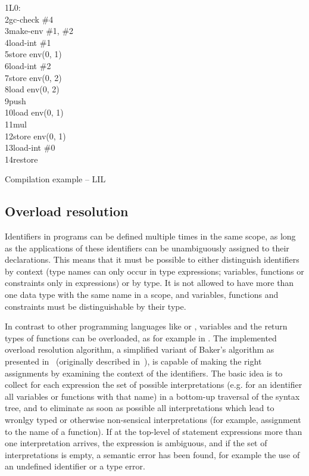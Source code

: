 \begin{Program}
\begin{ttlprog}
1\>L0:\\
2\>\>gc-check  \#4\\
3\>\>make-env  \#1, \#2\\
4\>\>load-int   \#1\\
5\>\>store     env(0, 1)\\
6\>\>load-int  \#2\\
7\>\>store     env(0, 2)\\
8\>\>load      env(0, 2)\\
9\>\>push\\
10\>\>load      env(0, 1)\\
11\>\>mul\\
12\>\>store     env(0, 1)\\
13\>\>load-int  \#0\\
14\>\>restore
\end{ttlprog}
\caption{Compilation example -- LIL}
\label{prog:mini-prog-lil}
\end{Program}

\subsection{Overload resolution}
\label{sec:overload-resolution}

%
Identifiers in \turtle{} programs can be defined multiple times in the
same scope, as long as the applications of these identifiers can be
unambiguously assigned to their declarations.  This means that it must
be possible to either distinguish identifiers by context (type names
can only occur in type expressions; variables, functions or
constraints only in expressions) or by type.  It is not allowed to
have more than one data type with the same name in a scope, and
variables, functions and constraints must be distinguishable by their
type.

%
In contrast to other programming languages like \java{} or
\cplusplus{}, variables and the return types of functions can be
overloaded, as for example in \ada{}.  The implemented overload
resolution algorithm, a simplified variant of Baker's algorithm as
presented in~\cite{bilsonOverload} (originally described
in~\cite{baker82overload}), is capable of making the right assignments
by examining the context of the identifiers.  The basic idea is to
collect for each expression the set of possible interpretations (e.g.
for an identifier all variables or functions with that name) in a
bottom-up traversal of the syntax tree, and to eliminate as soon as
possible all interpretations which lead to wronlgy typed or otherwise
non-sensical interpretations (for example, assignment to the name of a
function).  If at the top-level of statement expressions more than one
interpretation arrives, the expression is ambiguous, and if the set of
interpretations is empty, a semantic error has been found, for example
the use of an undefined identifier or a type error.

